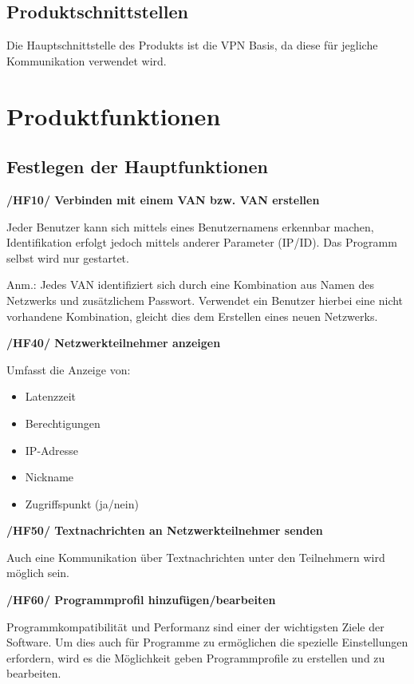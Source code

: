 \documentclass[a4paper,12pt]{scrreprt}
\begin{document}
	\section{Produktschnittstellen}
		
		Die Hauptschnittstelle des Produkts ist die VPN Basis, da diese für jegliche Kommunikation verwendet wird. 
		
\chapter{Produktfunktionen}
		\section{Festlegen der Hauptfunktionen}
			\textbf{/HF10/ Verbinden mit einem VAN bzw. VAN erstellen}
			
			Jeder Benutzer kann sich mittels eines Benutzernamens erkennbar machen, Identifikation erfolgt jedoch mittels anderer Parameter (IP/ID). Das Programm selbst wird nur gestartet.
			
			Anm.: Jedes VAN identifiziert sich durch eine Kombination aus Namen des Netzwerks und zusätzlichem Passwort. Verwendet ein Benutzer hierbei eine nicht vorhandene Kombination, gleicht dies dem Erstellen eines neuen Netzwerks. 
			
			
			\textbf { /HF40/ Netzwerkteilnehmer anzeigen
			}
					
			Umfasst die Anzeige von:
			\begin{itemize}
			
		
			\item Latenzzeit
			\item Berechtigungen
			\item IP-Adresse
			\item Nickname
			\item Zugriffspunkt (ja/nein)\\
				\end{itemize}
			
			
			
			
			
			\textbf {/HF50/ Textnachrichten an Netzwerkteilnehmer senden}
			
			
			Auch eine Kommunikation über Textnachrichten unter den Teilnehmern wird möglich sein.
			
			 \textbf {/HF60/ Programmprofil hinzufügen/bearbeiten}
			
			Programmkompatibilität und Performanz sind einer der wichtigsten Ziele der Software. Um dies auch für Programme zu ermöglichen die spezielle Einstellungen erfordern, wird es die Möglichkeit geben Programmprofile zu erstellen und zu bearbeiten.
			
\end{document}
